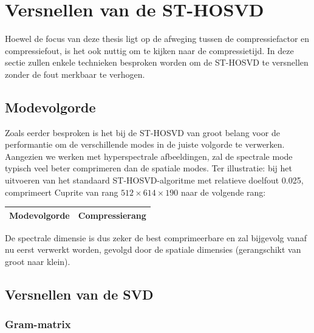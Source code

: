\section{Versnellen van de ST-HOSVD}

Hoewel de focus van deze thesis ligt op de afweging tussen de compressiefactor en compressiefout, is het ook nuttig om te kijken naar de compressietijd. In deze sectie zullen enkele technieken besproken worden om de ST-HOSVD te versnellen zonder de fout merkbaar te verhogen.

\subsection{Modevolgorde}

Zoals eerder besproken is het bij de ST-HOSVD van groot belang voor de performantie om de verschillende modes in de juiste volgorde te verwerken. Aangezien we werken met hyperspectrale afbeeldingen, zal de spectrale mode typisch veel beter comprimeren dan de spatiale modes. Ter illustratie: bij het uitvoeren van het standaard ST-HOSVD-algoritme met relatieve doelfout 0.025, comprimeert Cuprite van rang $512 \times 614 \times 190$ naar de volgende rang:
\begin{table}[H]
\centering
\begin{tabular}{|l|l|}
\hline
Modevolgorde & Compressierang \\ \hline

\end{tabular}
\end{table}
\newpage
De spectrale dimensie is dus zeker de best comprimeerbare en zal bijgevolg vanaf nu eerst verwerkt worden, gevolgd door de spatiale dimensies (gerangschikt van groot naar klein).

\subsection{Versnellen van de SVD}

\subsubsection{Gram-matrix}


